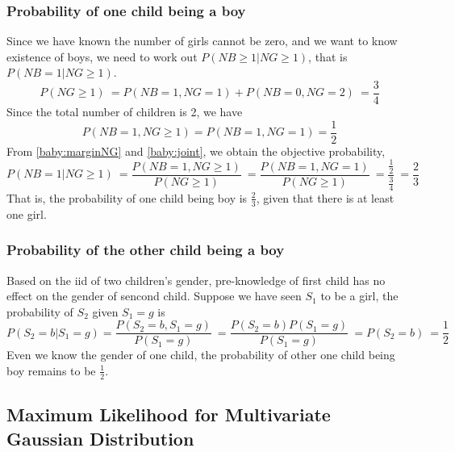 \documentclass[11pt,a4paper]{article}
\newcommand{\htab}{\hspace*{0.63cm}}
\begin{document}
\subsubsection{Probability of one child being a boy}
\htab Since we have known the number of girls cannot be zero, and we want to know existence of boys, we need to work out $P(NB \geq 1|NG \geq 1)$, that is $P(NB = 1 | NG \geq 1)$.
    \begin{equation} \label{baby:marginNG}
        P(NG \geq 1) \ 
        = P(NB = 1, NG = 1) + P(NB = 0, NG = 2) \ 
        = \frac{3}{4}
    \end{equation}
\htab Since the total number of children is 2, we have 
\begin{equation} \label{baby:joint} P(NB=1,NG\geq 1) = P(NB = 1 , NG = 1) = \frac{1}{2} \end{equation}  
    \htab From \eqref{baby:marginNG} and \eqref{baby:joint}, we obtain the objective probability,
    \begin{equation} P(NB = 1 | NG \geq 1) \
        = \frac{P(NB = 1 , NG \geq 1)}{P(NG \geq 1)} \
        = \frac{P(NB = 1 , NG = 1)}{P(NG \geq 1)} \
        = \frac{\frac{1}{2}}{\frac{3}{4}} \ 
        = \frac{2}{3} 
    \end{equation}
\htab That is, the probability of one child being boy is $\frac{2}{3}$, given that there is at least one girl.
\subsubsection{Probability of the other child being a boy}
\htab Based on the iid of two children's gender, pre-knowledge of first child has no effect on the gender of sencond child. Suppose we have seen $S_{1}$ to be a girl, the probability of $S_{2}$ given $S_{1} = g$ is
    \begin{equation}
        P(S_{2} = b | S_{1} = g) = \frac{P(S_{2} = b, S_{1} = g)}{P(S_{1} = g)} \ 
        = \frac{P(S_{2} = b) P(S_{1} = g)}{P(S_{1} = g)} \
        = P(S_{2} = b) \ 
        = \frac{1}{2}
    \end{equation} 
\htab Even we know the gender of one child, the probability of other one child being boy remains to be $\frac{1}{2}$.\\
\newpage

\subsection{Maximum Likelihood for Multivariate Gaussian Distribution}
\end{document}
